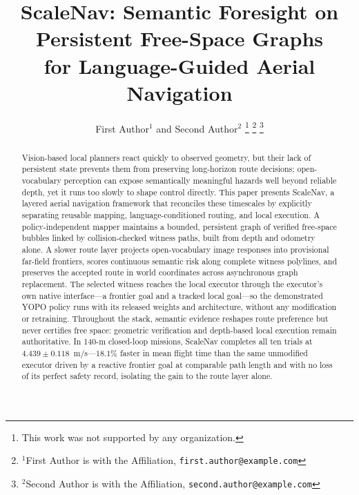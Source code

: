 \documentclass[letterpaper,10pt,conference]{ieeeconf}
\title{\LARGE \bf
ScaleNav: Semantic Foresight on Persistent Free-Space Graphs\\
for Language-Guided Aerial Navigation
}
\author{First Author$^{1}$ and Second Author$^{2}$%
\thanks{This work was not supported by any organization.}%
\thanks{$^{1}$First Author is with the Affiliation,
        {\tt\small first.author@example.com}}%
\thanks{$^{2}$Second Author is with the Affiliation,
        {\tt\small second.author@example.com}}%
}
\begin{document}
\maketitle
\thispagestyle{empty}
\pagestyle{empty}

\begin{abstract}
Vision-based local planners react quickly to observed geometry, but their lack
of persistent state prevents them from preserving long-horizon route
decisions; open-vocabulary perception can expose semantically meaningful
hazards well beyond reliable depth, yet it runs too slowly to shape control
directly.  This paper presents ScaleNav, a layered aerial navigation
framework that reconciles these timescales by explicitly separating reusable
mapping, language-conditioned routing, and local execution.  A
policy-independent mapper maintains a bounded, persistent graph of verified
free-space bubbles linked by collision-checked witness paths, built from depth
and odometry alone.  A slower route layer projects open-vocabulary image
responses into provisional far-field frontiers, scores continuous semantic
risk along complete witness polylines, and preserves the accepted route in
world coordinates across asynchronous graph replacement.  The selected witness
reaches the local executor through the executor's own native interface---a
frontier goal and a tracked local goal---so the demonstrated YOPO policy runs
with its released weights and architecture, without any modification or
retraining.  Throughout the stack, semantic
evidence reshapes route preference but never certifies free space: geometric
verification and depth-based local execution remain authoritative.  In 140-m
closed-loop missions, ScaleNav completes all ten trials at
$4.439\pm0.118$~m/s---$18.1\%$ faster in mean flight time than the same
unmodified executor driven by a reactive frontier goal at comparable path
length and with no loss of its perfect safety record, isolating the gain to
the route layer alone.
\end{abstract}

\end{document}

